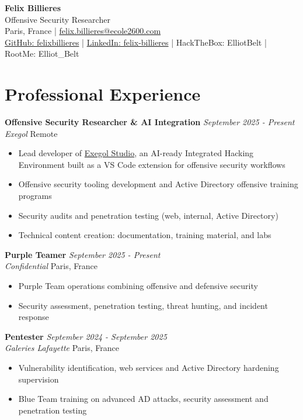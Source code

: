 \documentclass[9pt,a4paper]{extarticle}
\newcommand{\experienceitem}[4]{
\textbf{#1} \hfill \textit{#2} \\
\textit{#3} \hfill #4
}
\begin{document}
\begin{center}
    {\Huge \textbf{Felix Billieres}} \\
    \vspace{2pt}
    {\Large Offensive Security Researcher} \\
    \vspace{4pt}
    Paris, France | \href{mailto:felix.billieres@ecole2600.com}{felix.billieres@ecole2600.com} \\
    \href{https://github.com/felixbillieres}{GitHub: felixbillieres} |
    \href{https://linkedin.com/in/felix-billieres}{LinkedIn: felix-billieres} |
    HackTheBox: ElliotBelt | RootMe: Elliot\_Belt
\end{center}

\vspace{4pt}

\section{Professional Experience}

\experienceitem{Offensive Security Researcher \& AI Integration}{September 2025 - Present}{Exegol}{Remote}
\begin{itemize}
\item Lead developer of \href{https://exegol.com/studio}{Exegol Studio}, an AI-ready Integrated Hacking Environment built as a VS Code extension for offensive security workflows
\item Offensive security tooling development and Active Directory offensive training programs
\item Security audits and penetration testing (web, internal, Active Directory)
\item Technical content creation: documentation, training material, and labs
\end{itemize}

\experienceitem{Purple Teamer}{September 2025 - Present}{Confidential}{Paris, France}
\begin{itemize}
\item Purple Team operations combining offensive and defensive security
\item Security assessment, penetration testing, threat hunting, and incident response
\end{itemize}

\experienceitem{Pentester}{September 2024 - September 2025}{Galeries Lafayette}{Paris, France}
\begin{itemize}
\item Vulnerability identification, web services and Active Directory hardening supervision
\item Blue Team training on advanced AD attacks, security assessment and penetration testing
\end{itemize}
\end{document}
